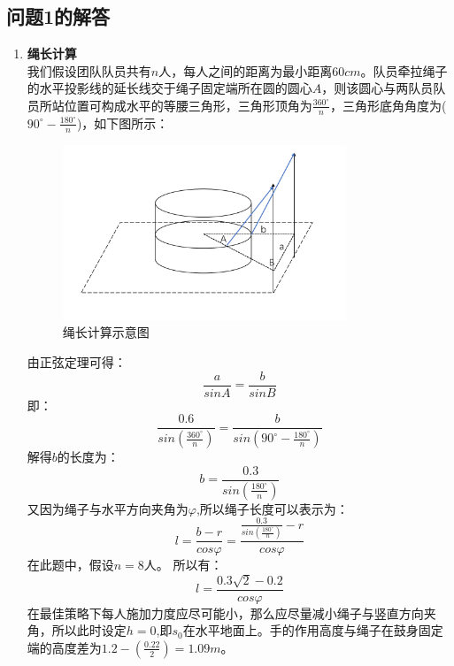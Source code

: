 \documentclass{cumcm}
\begin{document}
\subsection{问题1的解答}
\begin{enumerate}
\item \textbf{绳长计算}\\
我们假设团队队员共有$n$人，每人之间的距离为最小距离$60cm$。队员牵拉绳子的水平投影线的延长线交于绳子固定端所在圆的圆心$A$，则该圆心与两队员队员所站位置可构成水平的等腰三角形，三角形顶角为$\frac{360^{\circ}}{n}$，三角形底角角度为($90^{\circ}-\frac{180^{\circ}}{n}$)，如下图所示：
\begin{figure}[H]
\centering
\includegraphics[width=0.8\textwidth]{img/string.pdf}
\caption{绳长计算示意图}
\end{figure}
由正弦定理可得：
\begin{displaymath}
\frac{a}{sinA}=\frac{b}{sinB}
\end{displaymath}
即：
\begin{displaymath}
\frac{0.6}{sin({\frac{360^{\circ}}{n}})}=\frac{b}{sin({90^{\circ}-\frac{180^{\circ}}{n}})}
\end{displaymath}
解得$b$的长度为：
\begin{displaymath}
b=\frac{0.3}{sin( \frac{180^{\circ}}{n})}
\end{displaymath}
又因为绳子与水平方向夹角为$\varphi$,所以绳子长度可以表示为：
\begin{displaymath}
l=\frac{b-r}{cos\varphi}=\frac{\frac{0.3}{sin(\frac{180^{\circ}}{n})}-r}{cos\varphi}
\end{displaymath}
在此题中，假设$n=8$人。
所以有：
\begin{equation}
l=\frac{0.3\sqrt{2}-0.2}{cos\varphi}
\end{equation}
在最佳策略下每人施加力度应尽可能小，那么应尽量减小绳子与竖直方向夹角，所以此时设定$h=0$,即$s_0$在水平地面上。手的作用高度与绳子在鼓身固定端的高度差为$1.2-(\frac{0.22}{2})=1.09m$。

\end{enumerate}
\end{document}
